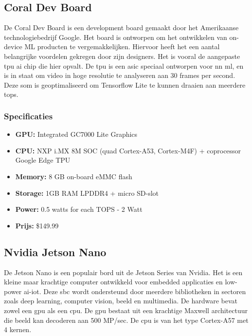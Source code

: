 
	\newpage

	\subsection{Coral Dev Board}
	De Coral Dev Board is een development board gemaakt door het Amerikaanse technologiebedrijf Google\citep{bron:coraldev}. Het board is ontworpen om het ontwikkelen van on-device ML producten te vergemakkelijken. Hiervoor heeft het een aantal belangrijke voordelen gekregen door zijn designers. Het is vooral de aangepaste \gls{tpu} \gls{ai} chip die hier opvalt. De \gls{tpu} is een \gls{asic} speciaal ontworpen voor \gls{nn} \gls{ml}, en is in staat om video in hoge resolutie te analyseren aan 30 frames per second. Deze \gls{som} is geoptimaliseerd om Tensorflow Lite te kunnen draaien aan meerdere \gls{tops}.
	
		\subsubsection{Specificaties}
		\begin{itemize}
			\item \textbf{GPU:} Integrated GC7000 Lite Graphics
			\item \textbf{CPU:} NXP i.MX 8M SOC (quad Cortex-A53, Cortex-M4F) + coprocessor Google Edge TPU
			\item \textbf{Memory:} 8 GB on-board eMMC flash
			\item \textbf{Storage:} 1GB RAM LPDDR4 + micro SD-slot
			\item \textbf{Power:} 0.5 watts for each TOPS - 2 Watt
			\item \textbf{Prijs:} \$149.99
		\end{itemize}
	
	
	\subsection{Nvidia Jetson Nano}
	De Jetson Nano is een populair bord uit de Jetson Series van Nvidia\citep{bron:jetsonnano}. Het is een kleine maar krachtige computer ontwikkeld voor embedded applicaties en low-power \gls{ai}-\gls{iot}. Deze \gls{sbc} wordt ondersteund door meerdere bibliotheken in sectoren zoals deep learning, computer vision, beeld en multimedia. De hardware bevat zowel een \gls{gpu} als een \gls{cpu}. De \gls{gpu} bestaat uit een krachtige Maxwell architectuur die beeld kan decoderen aan 500 MP/sec. De \gls{cpu} is van het type Cortex-A57 met 4 kernen.
	
